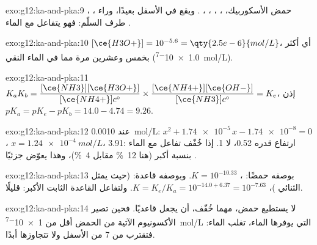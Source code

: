 \begin{solution}{exo:g12:ka-and-pka:9}
، ، حمض الأسكوربيك، ، ،
، ، . ويقع  في الأسفل بعيدًا،
وراء طرف السلّم: فهو يتفاعل مع الماء .
\end{solution}

\begin{solution}{exo:g12:ka-and-pka:10}
$[\ce{H3O+}] = 10^{-5.6} = \qty{2.5e-6}{mol/L}$، أي أكثر بخمس وعشرين مرة مما في
الماء النقي (\qty{1.0e-7}{mol/L}).
\end{solution}

\begin{solution}{exo:g12:ka-and-pka:11}
$K_a K_b = \dfrac{[\ce{NH3}][\ce{H3O+}]}{[\ce{NH4+}]c^\circ} \times
\dfrac{[\ce{NH4+}][\ce{OH-}]}{[\ce{NH3}]c^\circ} = K_e$، إذن
$pK_a = pK_e - pK_b = 14.0 - 4.74 = 9.26$.
\end{solution}

\begin{solution}{exo:g12:ka-and-pka:12}
عند \qty{0.0010}{mol/L}: $x^2 + \num{1.74e-5}\,x - \num{1.74e-8} = 0$،
$x = \qty{1.24e-4}{mol/L}$،  3.91: ارتفاع قدره 0.52، لا 1.  إذا
خُفّف تفاعل مع الماء بنسبة أكبر (هنا
\qty{12}{\percent} مقابل \qty{4}{\percent})، وهذا يعوّض جزئيًا
.
\end{solution}

\begin{solution}{exo:g12:ka-and-pka:13}
بوصفه حمضًا: ، $K = 10^{-10.33}$. وبوصفه
قاعدة:  (حيث يمثل  الثنائي )، $K = K_e/K_a = 10^{-14.0+6.37}
= 10^{-7.63}$. ولتفاعل القاعدة الثابت الأكبر:  قليلًا.
\end{solution}

\begin{solution}{exo:g12:ka-and-pka:14}
لا يستطيع حمض، مهما خُفّف، أن يجعل  قاعديًا. فحين تصير 
الأكسونيوم الآتية من الحمض أقل من \qty{1e-7}{mol/L} التي يوفرها
الماء، تغلب  الماء: فتقترب  من 7 من الأسفل
ولا تتجاوزها أبدًا.
\end{solution}

